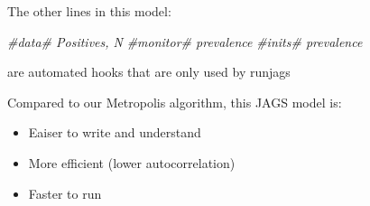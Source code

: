 \documentclass[
  ignorenonframetext,
  aspectratio=169,
]{beamer}
\newenvironment{Shaded}{\begin{snugshade}}{\end{snugshade}}
\newcommand{\CommentTok}[1]{\textcolor[rgb]{0.56,0.35,0.01}{\textit{#1}}}
\providecommand{\tightlist}{%
  \setlength{\itemsep}{0pt}\setlength{\parskip}{0pt}}
\begin{document}
\begin{frame}[fragile]
The other lines in this model:

\scriptsize

\begin{Shaded}
\begin{Highlighting}[]
\CommentTok{\#data\# Positives, N}
\CommentTok{\#monitor\# prevalence}
\CommentTok{\#inits\# prevalence}
\end{Highlighting}
\end{Shaded}

\normalsize

are automated hooks that are only used by runjags

\pause

Compared to our Metropolis algorithm, this JAGS model is:

\begin{itemize}
\tightlist
\item
  Eaiser to write and understand
\item
  More efficient (lower autocorrelation)
\item
  Faster to run
\end{itemize}
\end{frame}
\end{document}
